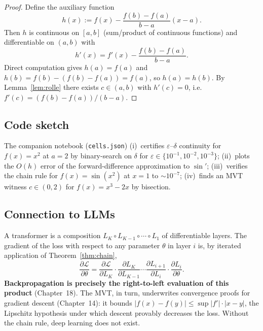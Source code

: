 \begin{proof}
Define the auxiliary function
\[
h(x):=f(x)-\frac{f(b)-f(a)}{b-a}(x-a).
\]
Then $h$ is continuous on $[a,b]$ (sum/product of continuous functions) and differentiable on $(a,b)$ with
\[
h'(x)=f'(x)-\frac{f(b)-f(a)}{b-a}.
\]
Direct computation gives $h(a)=f(a)$ and $h(b)=f(b)-(f(b)-f(a))=f(a)$, so $h(a)=h(b)$. By Lemma~\ref{lem:rolle} there exists $c\in(a,b)$ with $h'(c)=0$, i.e.\ $f'(c)=(f(b)-f(a))/(b-a)$.
\end{proof}

\subsection*{Code sketch}

The companion notebook (\texttt{cells.json}) (i)~certifies $\varepsilon$--$\delta$ continuity for $f(x)=x^2$ at $a=2$ by binary-search on $\delta$ for $\varepsilon\in\{10^{-1},10^{-2},10^{-3}\}$; (ii)~plots the $O(h)$ error of the forward-difference approximation to $\sin'$; (iii)~verifies the chain rule for $f(x)=\sin(x^2)$ at $x=1$ to $\sim 10^{-7}$; (iv)~finds an MVT witness $c\in(0,2)$ for $f(x)=x^3-2x$ by bisection.

\subsection*{Connection to LLMs}

A transformer is a composition $L_K\circ L_{K-1}\circ\cdots\circ L_1$ of differentiable layers. The gradient of the loss with respect to any parameter $\theta$ in layer $i$ is, by iterated application of Theorem~\ref{thm:chain},
\[
\frac{\partial \mathcal{L}}{\partial \theta}=\frac{\partial \mathcal{L}}{\partial L_K}\cdot\frac{\partial L_K}{\partial L_{K-1}}\cdots\frac{\partial L_{i+1}}{\partial L_i}\cdot\frac{\partial L_i}{\partial \theta}.
\]
\textbf{Backpropagation is precisely the right-to-left evaluation of this product} (Chapter~18). The MVT, in turn, underwrites convergence proofs for gradient descent (Chapter~14): it bounds $|f(x)-f(y)|\le\sup|f'|\cdot|x-y|$, the Lipschitz hypothesis under which descent provably decreases the loss. Without the chain rule, deep learning does not exist.
